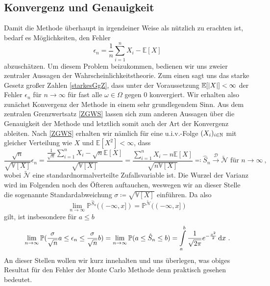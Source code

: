	\subsection{Konvergenz und Genauigkeit}
	Damit die Methode überhaupt in irgendeiner Weise als nützlich zu erachten ist, bedarf es Möglichkeiten, den Fehler \[
	 \epsilon_n = \frac{1}{n}\sum_{i=1}^{n}X_i -  \mathbb{E}[X]
	\]
	abzuschätzen. Um diesem Problem beizukommen, bedienen wir uns zweier zentraler Aussagen der Wahrscheinlichkeitstheorie. Zum einen sagt uns das starke Gesetz großer Zahlen \ref{starkesGgZ}, dass unter der Voraussetzung $ \mathbb{E}[| X |]<\infty $ der Fehler $ \epsilon_n $ für $ n \to \infty $ für fast alle $ \omega \in \Omega $ gegen $ 0 $ konvergiert. Wir erhalten also zunächst Konvergenz der Methode in einem sehr grundlegendem Sinn. Aus dem zentralen Grenzwertsatz \ref{ZGWS} lassen sich zum anderen Aussagen über die Genauigkeit der Methode und letztlich somit auch der Art der Konvergenz ableiten. Nach \ref{ZGWS} erhalten wir nämlich für eine u.i.v.-Folge $ (X_i)_{i \in \mathbb{N}} $ mit gleicher Verteilung wie $ X $ und $ \mathbb{E}[X^2] < \infty $, dass
	 \[ 
	 \frac{\sqrt{n}}{\sqrt{\mathbb{V}[X]}} \epsilon_n =  \frac{\frac{1}{\sqrt{n}}\sum_{i=1}^{n}X_i-\sqrt{n}\mathbb{E}[X]}{\sqrt{\mathbb{V}[X]}} = \frac{\sum_{i=1}^{n}X_i-n\mathbb{E}[X]}{\sqrt{n\mathbb{V}[X]}} \eqqcolon \hat{S}_n \stackrel{\mathcal{D}}{\to}  \widetilde{\mathcal{N}} \text{ für } n \to \infty \ ,
	 \]
	 wobei  $\widetilde{\mathcal{N}}$ eine standardnormalverteilte Zufallsvariable ist. Die Wurzel der Varianz wird im Folgenden noch des Öfteren auftauchen, weswegen wir an dieser Stelle die sogenannte Standardabweichung $ \sigma \coloneqq \sqrt{\mathbb{V}[X]} $ einführen.
	 Da also 
	 \[ \lim\limits_{n \to \infty} \mathbb{P}^{\hat{S}_n}((-\infty,x]) = \mathbb{P}^{ \widetilde{\mathcal{N}}}((-\infty,x])
	 \]
	 gilt, ist insbesondere für $ a \leq b $
	 \[
	 	\lim\limits_{n \to \infty} \mathbb{P}(\frac{\sigma}{\sqrt{n}}a \leq \epsilon_n \leq \frac{\sigma}{\sqrt{n}}b) = \lim\limits_{n \to \infty} \mathbb{P}(a \leq \hat{S}_n \leq b) = \int\limits_a^b \frac{1}{\sqrt{2\pi}}e^{-\frac{x^2}{2}} \, \mathrm{d} x \ .
	 \]
	 An dieser Stellen wollen wir kurz innehalten und uns überlegen, was obiges Resultat für den Fehler der Monte Carlo Methode denn praktisch gesehen bedeutet. 
